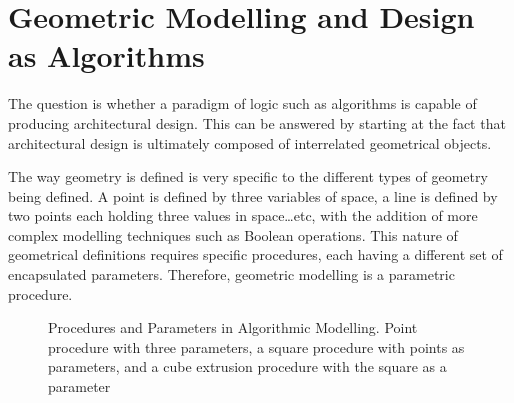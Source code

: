 \section{Geometric Modelling and Design as Algorithms}

The question is whether a paradigm of logic such as algorithms is capable of producing architectural design. This can be answered by starting at the fact that architectural design is ultimately composed of interrelated geometrical objects.

The way geometry is defined is very specific to the different types of geometry being defined. A point is defined by three variables of space, a line is defined by two points each holding three values in space\ldots etc, with the addition of more complex modelling techniques such as Boolean operations. This nature of geometrical definitions requires specific procedures, each having a different set of encapsulated parameters. Therefore, geometric modelling is a parametric procedure. \cite{hernandez06}

\begin{figure}[htbp]
\flushleft
{}
\centering
\vspace{5mm}
\caption[Procedures and Parameters in Algorithmic Modelling]{Procedures and Parameters in Algorithmic Modelling. {\footnotesize Point procedure with three parameters, a square procedure with points as parameters, and a cube extrusion procedure with the square as a parameter}}
\label{SqrAnalysis}
\end{figure}

